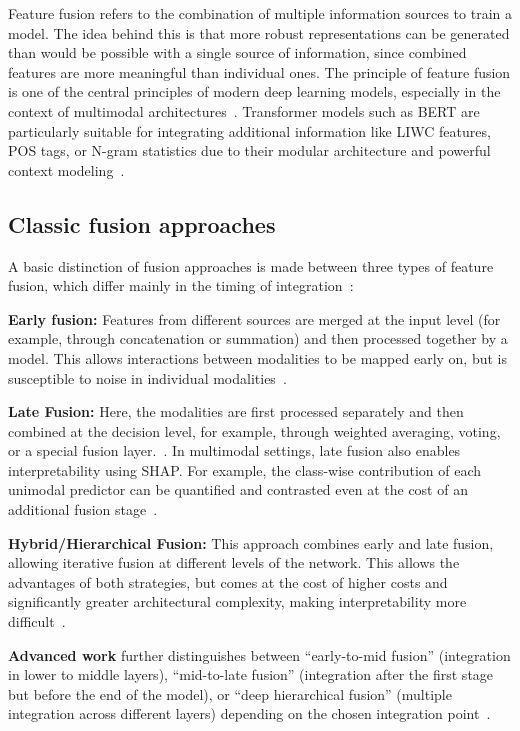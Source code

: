 Feature fusion refers to the combination of multiple information sources to train a model. The idea behind this is that more robust representations can be generated than would be possible with a single source of information, since combined features are more meaningful than individual ones. The principle of feature fusion is one of the central principles of modern deep learning models, especially in the context of multimodal architectures~\cite{li2024multimodal}. 
Transformer models such as BERT are particularly suitable for integrating additional information like LIWC features, POS tags, or N-gram statistics due to their modular architecture and powerful context modeling~\cite{nagrani2021attention}.

\subsection{Classic fusion approaches}
A basic distinction of fusion approaches is made between three types of feature fusion, which differ mainly in the timing of integration~\cite{li2024multimodal, li2024fusionreview}:

\textbf{Early fusion:} Features from different sources are merged at the input level (for example, through concatenation or summation) and then processed together by a model. This allows interactions between modalities to be mapped early on, but is susceptible to noise in individual modalities~\cite{cai2025multimodal}.

\textbf{Late Fusion:} Here, the modalities are first processed separately and then combined at the decision level, for example, through weighted averaging, voting, or a special fusion layer.~\cite{sharma2023late}. In multimodal settings, late fusion also enables interpretability using SHAP. For example, the class-wise contribution of each unimodal predictor can be quantified and contrasted even at the cost of an additional fusion stage~\cite{abdul2024decoding}.

\textbf{Hybrid/Hierarchical Fusion:} This approach combines early and late fusion, allowing iterative fusion at different levels of the network. This allows the advantages of both strategies, but comes at the cost of higher costs and significantly greater architectural complexity, making interpretability more difficult~\cite{li2024multimodal}.

\textbf{Advanced work} further distinguishes between “early-to-mid fusion” (integration in lower to middle layers), “mid-to-late fusion” (integration after the first stage but before the end of the model), or “deep hierarchical fusion” (multiple integration across different layers) depending on the chosen integration point~\cite{li2024multimodal}.

